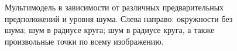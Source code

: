 \begin{figure}[h!]
\caption{Мультимодель в зависимости от различных предварительных предположений и уровня шума. Слева направо: окружности без шума; шум в радиусе круга; шум в радиусе круга, а также произвольные точки по всему изображению.}
\label{ce:fig3}
\end{figure}

